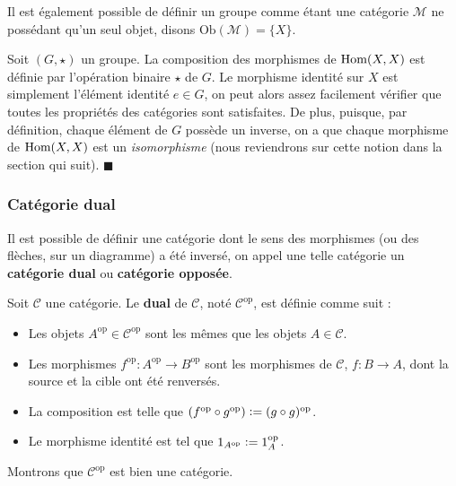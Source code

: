 \documentclass{article}
\begin{document}
Il est également possible de définir un groupe comme étant une catégorie $\mathcal M$ ne possédant qu'un seul objet, disons $\text{Ob}(\mathcal M)=\{X\}$.

\begin{example}{}
    Soit $(G, \star)$ un groupe. La composition des morphismes de $\text{Hom}(X, X)$ est définie par l'opération binaire $\star$ de $G$. Le morphisme identité sur $X$ est simplement l'élément identité $e\in G$, on peut alors assez facilement vérifier que toutes les propriétés des catégories sont satisfaites. De plus, puisque, par définition, chaque élément de $G$ possède un inverse, on a que chaque morphisme de $\text{Hom}(X, X)$ est un \textit{isomorphisme} (nous reviendrons sur cette notion dans la section qui suit). $\blacksquare$
\end{example}

\subsubsection{Catégorie dual}
Il est possible de définir une catégorie dont le sens des morphismes (ou des flèches, sur un diagramme) a été inversé, on appel une telle catégorie un \textbf{catégorie dual} ou \textbf{catégorie opposée}.

\begin{definition}{}
    Soit $\mathcal C$ une catégorie. Le \textbf{dual} de $\mathcal C$, noté $\mathcal C^{\text{op}}$, est définie comme suit :
    \begin{itemize}[label=\textbullet]
        \item Les objets $A^\text{op}\in\mathcal C^{\text{op}}$ sont les mêmes que les objets $A\in\mathcal C$.
        \item Les morphismes $f^\text{op}:A^\text{op}\to B^\text{op}$ sont les morphismes de $\mathcal C$, $f:B\to A$, dont la source et la cible ont été renversés.
        \item La composition est telle que $\left(f^\text{op}\circ g^\text{op}\right)\vcentcolon=(g\circ g)^\text{op}$.
        \item Le morphisme identité est tel que $1_{A^\text{op}}\vcentcolon=1^\text{op}_A$.
    \end{itemize}
\end{definition}

\noindent
Montrons que $\mathcal C^\text{op}$ est bien une catégorie.
\end{document}
